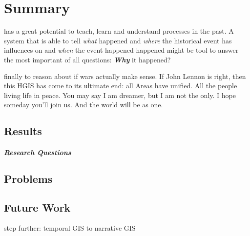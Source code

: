 
\chapter{Summary} %
\label{cha:summary}
has a great potential to teach, learn and understand processes in the past. A system that is able to tell \emph{what} happened and \emph{where} the historical event has influences on and \emph{when} the event happened happened might be tool to answer the most important of all questions:
\textbf{\emph{Why}} it happened?


finally to reason about if wars actually make sense.
If John Lennon is right, then this HGIS has come to its ultimate end: all Areas have unified. All the people living life in peace. You may say I am dreamer, but I am not the only. I hope someday you'll join us. And the world will be as one.

\section{Results} %
\label{sec:results}



\paragraph{Research Questions} %
\label{par:result_research_questions}



\section{Problems} %
\label{sec:problems}




\section{Future Work} %
\label{sec:future_work}

step further: temporal GIS to narrative GIS

